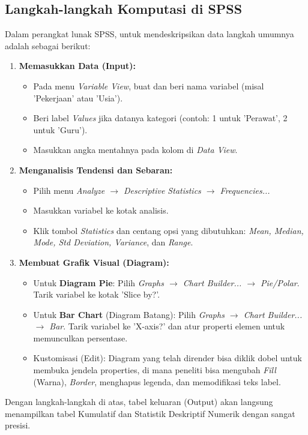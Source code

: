 \documentclass[12pt,a4paper]{article}
\begin{document}
\subsection{Langkah-langkah Komputasi di SPSS}
Dalam perangkat lunak SPSS, untuk mendeskripsikan data langkah umumnya adalah sebagai berikut:
\begin{enumerate}
    \item \textbf{Memasukkan Data (Input):}
    \begin{itemize}
        \item Pada menu \textit{Variable View}, buat dan beri nama variabel (misal 'Pekerjaan' atau 'Usia'). 
        \item Beri label \textit{Values} jika datanya kategori (contoh: 1 untuk 'Perawat', 2 untuk 'Guru').
        \item Masukkan angka mentahnya pada kolom di \textit{Data View}.
    \end{itemize}
    \item \textbf{Menganalisis Tendensi dan Sebaran:}
    \begin{itemize}
        \item Pilih menu \textit{Analyze $\rightarrow$ Descriptive Statistics $\rightarrow$ Frequencies...}
        \item Masukkan variabel ke kotak analisis.
        \item Klik tombol \textit{Statistics} dan centang opsi yang dibutuhkan: \textit{Mean, Median, Mode, Std Deviation, Variance}, dan \textit{Range}.
    \end{itemize}
    \item \textbf{Membuat Grafik Visual (Diagram):}
    \begin{itemize}
        \item Untuk \textbf{Diagram Pie}: Pilih \textit{Graphs $\rightarrow$ Chart Builder... $\rightarrow$ Pie/Polar}. Tarik variabel ke kotak 'Slice by?'.
        \item Untuk \textbf{Bar Chart} (Diagram Batang): Pilih \textit{Graphs $\rightarrow$ Chart Builder... $\rightarrow$ Bar}. Tarik variabel ke 'X-axis?' dan atur properti elemen untuk memunculkan persentase.
        \item Kustomisasi (Edit): Diagram yang telah dirender bisa diklik dobel untuk membuka jendela properties, di mana peneliti bisa mengubah \textit{Fill} (Warna), \textit{Border}, menghapus legenda, dan memodifikasi teks label.
    \end{itemize}
\end{enumerate}

Dengan langkah-langkah di atas, tabel keluaran (Output) akan langsung menampilkan tabel Kumulatif dan Statistik Deskriptif Numerik dengan sangat presisi.
\end{document}
